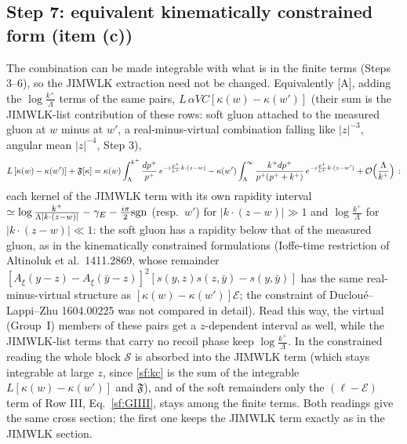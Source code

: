 \subsection{Step 7: equivalent kinematically constrained form (item (c))}
\noindent The combination can be made integrable with what is in the finite terms (Steps 3--6), so the JIMWLK extraction need not be changed. Equivalently [A], adding the $\log\frac{k^{+}}{\Lambda}$ terms of the same pairs, $L\,\alpha V C[\kappa(w)-\kappa(w')]$ (their sum is the JIMWLK-list contribution of these rows: soft gluon attached to the measured gluon at $w$ minus at $w'$, a real-minus-virtual combination falling like $|z|^{-3}$, angular mean $|z|^{-4}$, Step 3),
\begin{align}
L\,[\kappa(w)-\kappa(w')]+\mathfrak{F}[\kappa]=\kappa(w)\int_{\Lambda}^{k^{+}}\frac{dp^{+}}{p^{+}}\,e^{-i\frac{p^{+}}{k^{+}}k\cdot(z-w)}-\kappa(w')\int_{\Lambda}^{\infty}\frac{k^{+}dp^{+}}{p^{+}(p^{+}+k^{+})}\,e^{-i\frac{p^{+}}{k^{+}}k\cdot(z-w')}+{\cal O}\Big(\frac{\Lambda}{k^{+}}\Big)\,:\label{sf:kc}
\end{align}
each kernel of the JIMWLK term with its own rapidity interval $\simeq\log\frac{k^{+}}{\Lambda|k\cdot(z-w)|}-\gamma_{E}-\frac{i\pi}{2}{\rm sgn}$ (resp.\ $w'$) for $|k\cdot(z-w)|\gg1$ and $\log\frac{k^{+}}{\Lambda}$ for $|k\cdot(z-w)|\ll1$: the soft gluon has a rapidity below that of the measured gluon, as in the kinematically constrained formulations (Ioffe-time restriction of Altinoluk et al.\ 1411.2869, whose remainder $[A_{\xi}(y-z)-A_{\xi}(\bar y-z)]^{2}[s(y,z)s(z,\bar y)-s(y,\bar y)]$ has the same real-minus-virtual structure as $[\kappa(w)-\kappa(w')]\mathcal{E}$; the constraint of Ducloué--Lappi--Zhu 1604.00225 was not compared in detail). Read this way, the virtual (Group~I) members of these pairs get a $z$-dependent interval as well, while the JIMWLK-list terms that carry no recoil phase keep $\log\frac{k^{+}}{\Lambda}$. In the constrained reading the whole block $\mathcal{S}$ is absorbed into the JIMWLK term (which stays integrable at large $z$, since \eqref{sf:kc} is the sum of the integrable $L[\kappa(w)-\kappa(w')]$ and $\mathfrak{F}$), and of the soft remainders only the $(\ell-\mathcal{E})$ term of Row III, Eq.~\eqref{sf:GIIII}, stays among the finite terms. Both readings give the same cross section; the first one keeps the JIMWLK term exactly as in the JIMWLK section.

